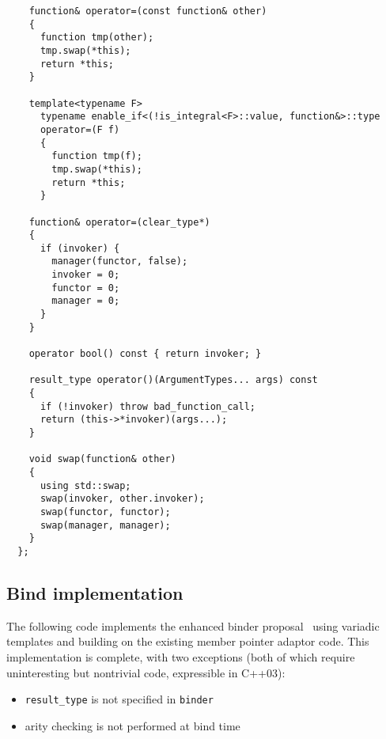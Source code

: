 \documentclass{article}
\begin{document}
\begin{verbatim}
    function& operator=(const function& other)
    {
      function tmp(other);
      tmp.swap(*this);
      return *this;
    }
    
    template<typename F> 
      typename enable_if<(!is_integral<F>::value, function&>::type
      operator=(F f)
      {
        function tmp(f);
        tmp.swap(*this);
        return *this;
      }
    
    function& operator=(clear_type*)
    {
      if (invoker) { 
        manager(functor, false);
        invoker = 0;
        functor = 0;
        manager = 0;
      }
    }

    operator bool() const { return invoker; }

    result_type operator()(ArgumentTypes... args) const
    {
      if (!invoker) throw bad_function_call;
      return (this->*invoker)(args...);
    }
    
    void swap(function& other)
    {
      using std::swap;
      swap(invoker, other.invoker);
      swap(functor, functor);
      swap(manager, manager);
    }
  };
\end{verbatim}
\normalsize

\subsection{Bind implementation}
\label{bindimpl}
The following code implements the enhanced binder
proposal~\cite{Dimov03b} using variadic templates and building on the
existing member pointer adaptor code. This implementation is complete,
with two exceptions (both of which require uninteresting but
nontrivial code, expressible in C++03):
\begin{itemize}
  \item {\tt result\_type} is not specified in {\tt binder}
  \item arity checking is not performed at bind time
\end{itemize}
\end{document}

